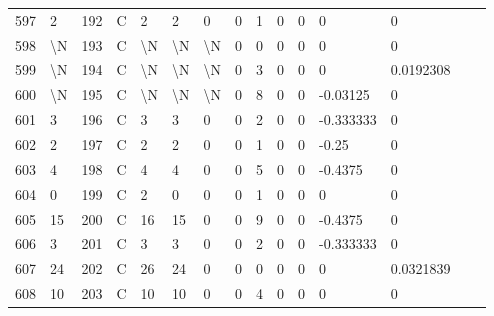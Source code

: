 \begin{longtable}{lllllllllllllll}
	597 & 2                 & 192 & C   & 2                 & 2                 & 0                 & 0    & 1          & 0              & 0              & 0             & 0            \\
	598 & \textbackslash{}N & 193 & C   & \textbackslash{}N & \textbackslash{}N & \textbackslash{}N & 0    & 0          & 0              & 0              & 0             & 0            \\
	599 & \textbackslash{}N & 194 & C   & \textbackslash{}N & \textbackslash{}N & \textbackslash{}N & 0    & 3          & 0              & 0              & 0             & 0.0192308    \\
	600 & \textbackslash{}N & 195 & C   & \textbackslash{}N & \textbackslash{}N & \textbackslash{}N & 0    & 8          & 0              & 0              & -0.03125      & 0            \\
	601 & 3                 & 196 & C   & 3                 & 3                 & 0                 & 0    & 2          & 0              & 0              & -0.333333     & 0            \\
	602 & 2                 & 197 & C   & 2                 & 2                 & 0                 & 0    & 1          & 0              & 0              & -0.25         & 0            \\
	603 & 4                 & 198 & C   & 4                 & 4                 & 0                 & 0    & 5          & 0              & 0              & -0.4375       & 0            \\
	604 & 0                 & 199 & C   & 2                 & 0                 & 0                 & 0    & 1          & 0              & 0              & 0             & 0            \\
	605 & 15                & 200 & C   & 16                & 15                & 0                 & 0    & 9          & 0              & 0              & -0.4375       & 0            \\
	606 & 3                 & 201 & C   & 3                 & 3                 & 0                 & 0    & 2          & 0              & 0              & -0.333333     & 0            \\
	607 & 24                & 202 & C   & 26                & 24                & 0                 & 0    & 0          & 0              & 0              & 0             & 0.0321839    \\
	608 & 10                & 203 & C   & 10                & 10                & 0                 & 0    & 4          & 0              & 0              & 0             & 0            \\

\end{longtable}
